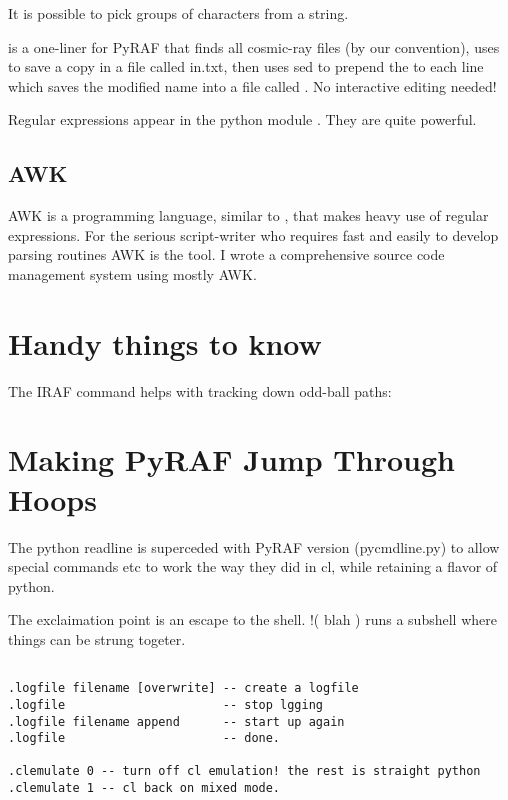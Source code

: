 It is possible to pick groups of characters from a string.

{\color{verbcolor}{\verb#!ls -1 c_*fits | tee in.list | sed -e 's/^/c_/' > out.list#}}

is a one-liner for PyRAF that finds all cosmic-ray files (by our convention),
uses {\color{verbcolor}{\verb#tee#}} to save a copy in a file called in.txt,
then uses sed to prepend the {\color{verbcolor}{\verb#c_#}} to each line
which saves the modified name into a file called {\color{verbcolor}{\verb#out.list#}}.
No interactive editing needed!

Regular expressions appear in the python module {\color{verbcolor}{\verb#re#}}.
They are quite powerful.

\subsection{AWK}

AWK is a programming language, similar to {\color{verbcolor}{\verb#lex#}},
that makes heavy use of regular expressions. For the serious script-writer
who requires fast and easily to develop parsing routines AWK is the tool.
I wrote a comprehensive source code management system using mostly AWK.

\section{Handy things to know}

The IRAF command {\color{verbcolor}{\verb#envget('param')#}} helps
with tracking down odd-ball paths:

\section{Making PyRAF Jump Through Hoops}

The python readline is superceded with PyRAF version (pycmdline.py) to allow
special commands etc to work the way they did in cl, while
retaining a flavor of python.

The exclaimation point is an escape to the shell.
!( blah ) runs a subshell where things can be strung togeter.

\begingroup \fontsize{10pt}{10pt}
\selectfont
\begin{verbatim} 

.logfile filename [overwrite] -- create a logfile
.logfile                      -- stop lgging
.logfile filename append      -- start up again
.logfile                      -- done.

.clemulate 0 -- turn off cl emulation! the rest is straight python
.clemulate 1 -- cl back on mixed mode.
\end{verbatim}
\endgroup


